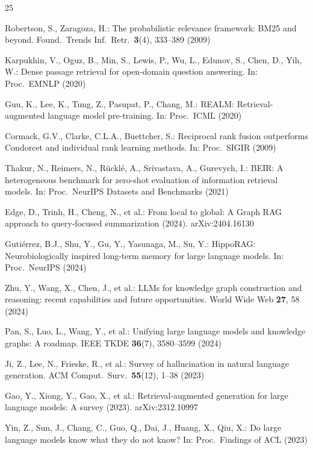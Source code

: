 \documentclass[runningheads]{llncs}
\begin{document}
%
%
\begin{thebibliography}{25}

Robertson, S., Zaragoza, H.: The probabilistic relevance framework: BM25 and
beyond. Found.\ Trends Inf.\ Retr.\ \textbf{3}(4), 333--389 (2009)

Karpukhin, V., Oguz, B., Min, S., Lewis, P., Wu, L., Edunov, S., Chen, D.,
Yih, W.: Dense passage retrieval for open-domain question answering. In:
Proc.\ EMNLP (2020)

Guu, K., Lee, K., Tung, Z., Pasupat, P., Chang, M.: REALM: Retrieval-augmented
language model pre-training. In: Proc.\ ICML (2020)

Cormack, G.V., Clarke, C.L.A., Buettcher, S.: Reciprocal rank fusion
outperforms Condorcet and individual rank learning methods. In: Proc.\ SIGIR
(2009)

Thakur, N., Reimers, N., R{\"u}ckl{\'e}, A., Srivastava, A., Gurevych, I.:
BEIR: A heterogeneous benchmark for zero-shot evaluation of information
retrieval models. In: Proc.\ NeurIPS Datasets and Benchmarks (2021)

Edge, D., Trinh, H., Cheng, N., et al.: From local to global: A Graph RAG
approach to query-focused summarization (2024). arXiv:2404.16130

Guti{\'e}rrez, B.J., Shu, Y., Gu, Y., Yasunaga, M., Su, Y.: HippoRAG:
Neurobiologically inspired long-term memory for large language models. In:
Proc.\ NeurIPS (2024)

Zhu, Y., Wang, X., Chen, J., et al.: LLMs for knowledge graph construction and
reasoning: recent capabilities and future opportunities. World Wide Web
\textbf{27}, 58 (2024)

Pan, S., Luo, L., Wang, Y., et al.: Unifying large language models and
knowledge graphs: A roadmap. IEEE TKDE \textbf{36}(7), 3580--3599 (2024)

Ji, Z., Lee, N., Frieske, R., et al.: Survey of hallucination in natural
language generation. ACM Comput.\ Surv.\ \textbf{55}(12), 1--38 (2023)

Gao, Y., Xiong, Y., Gao, X., et al.: Retrieval-augmented generation for large
language models: A survey (2023). arXiv:2312.10997

Yin, Z., Sun, J., Chang, C., Guo, Q., Dai, J., Huang, X., Qiu, X.: Do large
language models know what they do not know? In: Proc.\ Findings of ACL
(2023)


\end{thebibliography}
\end{document}
